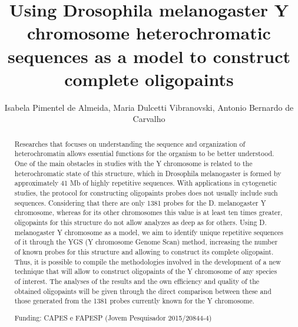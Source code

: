 \documentclass[twoside]{article}
\title{\vspace{-15mm}\fontsize{24pt}{10pt}\selectfont\textbf{ Using  Drosophila melanogaster Y chromosome heterochromatic sequences as a model to construct complete oligopaints }} %
\author{ Isabela Pimentel de Almeida, Maria Dulcetti Vibranovski, Antonio Bernardo de Carvalho }
\affil{ Universidade Federal do Rio de Janeiro }
\date{}
\begin{document}
  
  
  \maketitle %
  
  
  \thispagestyle{fancy} %
  
  
  \begin{abstract}
  Researches that focuses on understanding the sequence and organization of heterochromatin allows essential functions for the organism to be better understood. One of the main obstacles in studies with the Y chromosome is related to the heterochromatic state of this structure,  which in Drosophila melanogaster is formed by approximately 41 Mb of highly repetitive sequences. With applications in cytogenetic studies,  the protocol for constructing oligopaints probes does not usually include such sequences. Considering that there are only 1381 probes for the D. melanogaster Y chromosome,  whereas for its other chromosomes this value is at least ten times greater,  oligopaints for this structure do not allow analyzes as deep as for others. Using D. melanogaster Y chromosome as a model,  we aim to identify unique repetitive sequences of it through the YGS (Y chromosome Genome Scan) method,  increasing the number of known probes for this structure and allowing to construct its complete oligopaint. Thus,  it is possible to compile the methodologies involved in the development of a new technique that will allow to construct oligopaints of the Y chromosome of any species of interest. The analyses of the results and the own efficiency and quality of the obtained oligopaints will be given through the direct comparison between these and those generated from the 1381 probes currently known for the Y chromosome.
  
  Funding: CAPES e FAPESP (Jovem Pesquisador 2015/20844-4) \\ 
  \end{abstract}
  
\end{document}
